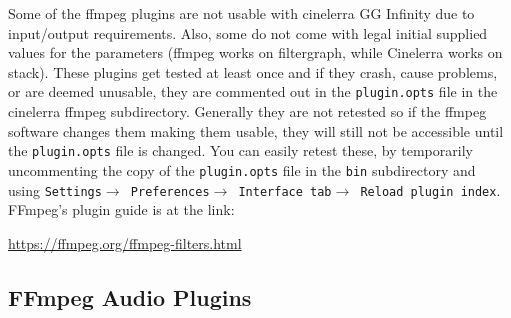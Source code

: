 Some of the ffmpeg plugins are not usable with cinelerra GG Infinity due to input/output requirements. Also, some do not come with legal initial supplied values for the parameters (ffmpeg works on filtergraph, while Cinelerra works on stack). These plugins get tested at least once and if they crash, cause problems, or are deemed unusable, they are commented out in the \texttt{plugin.opts} file in the cinelerra ffmpeg subdirectory. Generally they are not retested so if the ffmpeg software changes them making them usable, they will still not be accessible until the \texttt{plugin.opts} file is changed. You can easily retest these, by temporarily uncommenting the copy of the \texttt{plugin.opts} file in the \texttt{bin} subdirectory and using \texttt{Settings$\rightarrow$ Preferences$\rightarrow$ Interface tab$\rightarrow$ Reload plugin index}.
FFmpeg’s plugin guide is at the link:

\url{https://ffmpeg.org/ffmpeg-filters.html}

\subsection{FFmpeg Audio Plugins}%
\label{sub:ffmpeg_audio_plugins}


